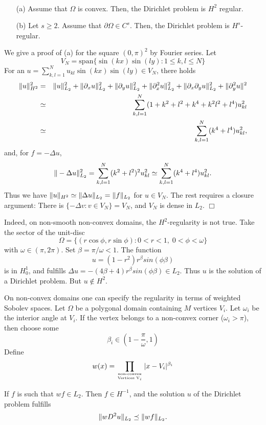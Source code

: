 \begin{theorem}  ~
\begin{enumerate}
\item[(a)] Assume that $\Omega$ is convex. Then, the Dirichlet problem is $H^2$ regular.
\item[(b)] Let $s \geq 2$. Assume that $\partial \Omega \in C^s$. Then,
the Dirichlet problem is $H^s$-regular.
\end{enumerate}
\end{theorem}
We give a proof of (a) for the square $(0,\pi)^2$ by Fourier series. Let 
$$
V_N = \mbox{span} \{ \sin (k x) \sin (ly) : 1 \leq k,l \leq N \}
$$
For an $u = \sum_{k,l = 1}^N u_{kl} \sin (kx) \sin (ly) \in V_N$, there
holds
\begin{eqnarray*}
\| u \|_{H^2}^2 & = & \| u \|_{L_2}^2 + \| \partial_x u \|_{L_2}^2 + \| \partial_y u \|_{L_2}^2 + \| \partial _x^2 u \|_{L_2}^2 + \| \partial_x \partial_y u \|_{L_2}^2 + \| \partial_y^2 u \|^2 \\
        & \simeq & \sum_{k,l = 1}^N (1 + k^2 +l^2 + k^4 + k^2 l^2 + l^4) u_{kl}^2 \\
        & \simeq & \sum_{k,l = 1}^N (k^4 + l^4) u_{kl}^2,
\end{eqnarray*}
and, for $f = -\Delta u$,
$$
\| - \Delta u \|_{L_2}^2 = \sum_{k,l=1}^N  (k^2+l^2)^2 u_{kl}^2 
        \simeq  \sum_{k,l=1}^N  (k^4+l^4) u_{kl}^2.
$$
Thus we have $\| u \|_{H^2} \simeq \| \Delta u \|_{L_2} = \| f \|_{L_2}$ for
$u \in V_N$. The rest requires a closure argument: There is 
$\{ -\Delta v : v \in V_N \} = V_N$, and $V_N$ is dense in $L_2$. 
\hfill $\Box$

Indeed, on non-smooth non-convex domains, the $H^2$-regularity is not true.
Take the sector of the unit-disc
$$
\Omega = \{ (r \cos \phi, r \sin \phi) : 0 < r < 1, \; 0 < \phi < \omega \}
$$
with $\omega \in (\pi, 2 \pi)$. Set $\beta = \pi/\omega < 1$. The function
$$
u = (1-r^2) r^\beta sin (\phi \beta)
$$
is in $H_0^1$, and fulfills 
$\Delta u = -(4 \beta + 4) r^{\beta} sin (\phi \beta) \in L_2$.
Thus $u$ is the solution of a Dirichlet problem. But $u \not\in H^2$.


On non-convex domains one can specify the regularity in terms of weighted
Sobolev spaces. Let $\Omega$ be a polygonal domain containing $M$ vertices 
$V_i$. 
Let $\omega_i$ be the interior angle at $V_i$. If the vertex belongs to
a non-convex corner ($\omega_i > \pi$), then choose some 
$$
\beta_i \in (1 - \frac{\pi}{\omega}, 1)
$$
Define
$$
w(x) = \prod_{\mbox{\tiny non-convex} \atop \mbox{\tiny Vertices V}_i}  | x - V_i |^{\beta_i}
$$
\begin{theorem} If $f$ is such that $w f \in L_2$. Then $f \in H^{-1}$, and
the solution $u$ of the Dirichlet problem fulfills
$$
\| w D^2 u \|_{L_2} \preceq \| w f \|_{L_2}.
$$
\end{theorem}
